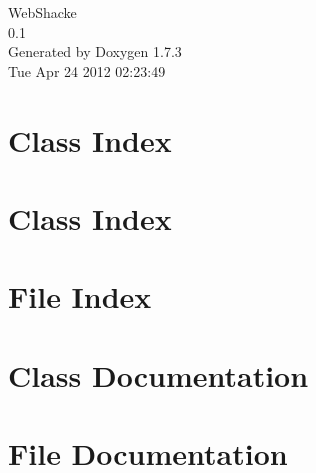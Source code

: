 \documentclass[a4paper]{book}
\begin{document}
\hypersetup{pageanchor=false}
\begin{titlepage}
\vspace*{7cm}
\begin{center}
{\Large WebShacke \\[1ex]\large 0.1 }\\
\vspace*{1cm}
{\large Generated by Doxygen 1.7.3}\\
\vspace*{0.5cm}
{\small Tue Apr 24 2012 02:23:49}\\
\end{center}
\end{titlepage}
\clearemptydoublepage
{}
\tableofcontents
\clearemptydoublepage
{}
\hypersetup{pageanchor=true}
\chapter{Class Index}

\chapter{Class Index}

\chapter{File Index}

\chapter{Class Documentation}





























\chapter{File Documentation}















\printindex
\end{document}
